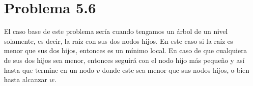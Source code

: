 \documentclass{article}
\begin{document}
\section*{Problema 5.6}


El caso base de este problema sería cuando tengamos un árbol de un nivel
solamente, es decir, la raíz con sus dos nodos hijos. En este caso si la raíz es
menor que sus dos hijos, entonces es un mínimo local. En caso de que cualquiera
de sus dos hijos sea menor, entonces seguirá con el nodo hijo más pequeño y así
hasta que termine en un nodo $v$ donde este sea menor que sus nodos hijos, o
bien hasta alcanzar $w$.
\end{document}
